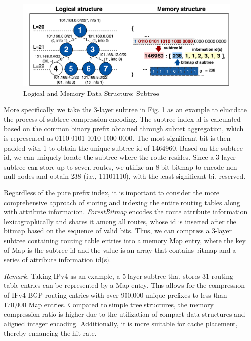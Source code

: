 \begin{figure}
	\centering
	\includegraphics[width=\linewidth]{figs/nsdi-tree.png}
	\caption{\small Logical and Memory Data Structure: Subtree}
	\label{fig:treestructure}
\end{figure}


 More specifically, we take the 3-layer subtree in Fig. \ref{fig:treestructure} as an example to elucidate the process of subtree compression encoding. The subtree index id is calculated based on the common binary prefix obtained through subnet aggregation, which is represented as 0110 0101 1010 1000 0000. The most significant bit is then padded with 1 to obtain the unique subtree id of 1464960. Based on the subtree id, we can uniquely locate the subtree where the route resides.  
Since a 3-layer subtree can store up to seven routes, we utilize an 8-bit bitmap to encode non-null nodes and obtain 238 (i.e., 11101110), with the least significant bit reserved. 

Regardless of the pure prefix index, it is important to consider the more comprehensive approach of storing and indexing the entire routing tables along with attribute information. \emph{ForestBitmap} encodes the route attribute information lexicographically and shares it among all routes, whose id is inserted after the bitmap based on the sequence of valid bits. Thus, we can compress a 3-layer subtree containing routing table entries into a memory Map entry, where the key of Map is the subtree id and the value is an array that contains bitmap and a series of attribute information id(s). 

\emph{Remark.} Taking IPv4 as an example, a 5-layer subtree that stores 31 routing table entries can be represented by a Map entry. This allows for the compression of IPv4 BGP routing entries with over 900,000 unique prefixes to less than 170,000 Map entries.
Compared to simple tree structures, the memory compression ratio is higher due to the utilization of compact data structures and aligned integer encoding. Additionally, it is more suitable for cache placement, thereby enhancing the hit rate.



